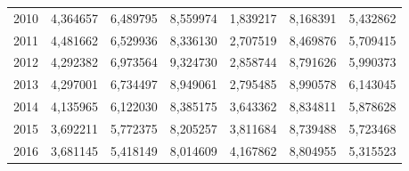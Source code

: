 \begin{table}
\begin{tabular}{p{1cm}p{2cm}p{2cm}p{2cm}p{2cm}p{2cm}p{2cm}}
 2010 &                              4,364657 &     6,489795 &          8,559974 &                                     1,839217 &                                      8,168391 & 5,432862 \\
 2011 &                              4,481662 &     6,529936 &          8,336130 &                                     2,707519 &                                      8,469876 & 5,709415 \\
 2012 &                              4,292382 &     6,973564 &          9,324730 &                                     2,858744 &                                      8,791626 & 5,990373 \\
 2013 &                              4,297001 &     6,734497 &          8,949061 &                                     2,795485 &                                      8,990578 & 6,143045 \\
 2014 &                              4,135965 &     6,122030 &          8,385175 &                                     3,643362 &                                      8,834811 & 5,878628 \\
 2015 &                              3,692211 &     5,772375 &          8,205257 &                                     3,811684 &                                      8,739488 & 5,723468 \\
 2016 &                              3,681145 &     5,418149 &          8,014609 &                                     4,167862 &                                      8,804955 & 5,315523 \\
\bottomrule
\end{tabular}
\end{table}
